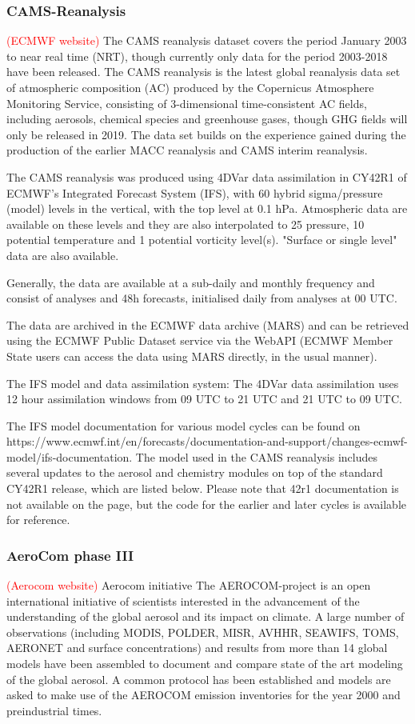 \documentclass[journal abbreviation, manuscript]{copernicus}
\begin{document}
\subsubsection{CAMS-Reanalysis}
\textcolor{red}{(ECMWF website)} The CAMS reanalysis dataset covers the period January 2003 to near real time (NRT), though currently only data for the period 2003-2018 have been released. The CAMS reanalysis is the latest global reanalysis data set of atmospheric composition (AC) produced by the Copernicus Atmosphere Monitoring Service, consisting of 3-dimensional time-consistent AC fields, including aerosols, chemical species and greenhouse gases, though GHG fields will only be released in 2019. The data set builds on the experience gained during the production of the earlier MACC reanalysis and CAMS interim reanalysis.

The CAMS reanalysis was produced using 4DVar data assimilation in CY42R1 of ECMWF’s Integrated Forecast System (IFS), with 60 hybrid sigma/pressure (model) levels in the vertical, with the top level at 0.1 hPa. Atmospheric data are available on these levels and they are also interpolated to 25 pressure, 10 potential temperature and 1 potential vorticity level(s). "Surface or single level" data are also available.

Generally, the data are available at a sub-daily and monthly frequency and consist of analyses and 48h forecasts, initialised daily from analyses at 00 UTC.

The data are archived in the ECMWF data archive (MARS) and can be retrieved using the ECMWF Public Dataset service via the WebAPI (ECMWF Member State users can access the data using MARS directly, in the usual manner).

The IFS model and data assimilation system:
The 4DVar data assimilation uses 12 hour assimilation windows from 09 UTC to 21 UTC and 21 UTC to 09 UTC.

The IFS model documentation for various model cycles can be found on https://www.ecmwf.int/en/forecasts/documentation-and-support/changes-ecmwf-model/ifs-documentation. The model used in the CAMS reanalysis includes several updates to the aerosol and chemistry modules on top of the standard CY42R1 release, which are listed below. Please note that 42r1 documentation is not available on the page, but the code for the earlier and later cycles is available for reference.

\subsubsection{AeroCom phase III}
\textcolor{red}{(Aerocom website)} Aerocom initiative The AEROCOM-project is an open international initiative of scientists interested in the advancement of the understanding of the global aerosol and its impact on climate. A large number of observations (including MODIS, POLDER, MISR, AVHHR, SEAWIFS, TOMS, AERONET and surface concentrations) and results from more than 14 global models have been assembled to document and compare state of the art modeling of the global aerosol. A common protocol has been established and models are asked to make use of the AEROCOM emission inventories for the year 2000 and preindustrial times.
\end{document}
